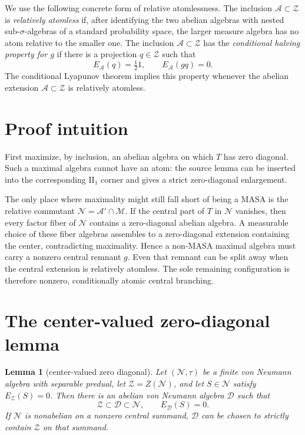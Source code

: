 \documentclass[11pt]{article}
\newtheorem{lemma}{Lemma}
\newcommand{\M}{\mathcal M}
\newcommand{\A}{\mathcal A}
\newcommand{\N}{\mathcal N}
\newcommand{\Z}{\mathcal Z}
\newcommand{\D}{\mathcal D}
\begin{document}
We use the following concrete form of relative atomlessness. The inclusion
$\A\subset\Z$ is \emph{relatively atomless} if, after identifying the two
abelian algebras with nested sub-$\sigma$-algebras of a standard probability
space, the larger measure algebra has no atom relative to the smaller one.
The inclusion
$\A\subset\Z$ has the \emph{conditional halving property for $g$} if there is
a projection $q\in\Z$ such that
\[
 E_{\A}(q)=\tfrac12 1,
 \qquad E_{\A}(gq)=0.
\]
The conditional Lyapunov theorem \cite{DE} implies this property whenever the
abelian extension $\A\subset\Z$ is relatively atomless.

\section{Proof intuition}

First maximize, by inclusion, an abelian algebra on which $T$ has zero
diagonal. Such a maximal algebra cannot have an atom: the source lemma can be
inserted into the corresponding $\mathrm{II}_1$ corner and gives a strict
zero-diagonal enlargement.

The only place where maximality might still fall short of being a MASA is the
relative commutant $\N=\A'\cap\M$. If the central part of $T$ in $\N$ vanishes,
then every factor fiber of $\N$ contains a zero-diagonal abelian algebra. A
measurable choice of these fiber algebras assembles to a zero-diagonal
extension containing the center, contradicting maximality. Hence a non-MASA
maximal algebra must carry a nonzero central remnant $g$. Even that remnant can
be split away when the central extension is relatively atomless. The sole
remaining configuration is therefore nonzero, conditionally atomic central
branching.

\section{The center-valued zero-diagonal lemma}

\begin{lemma}[center-valued zero diagonal]\label{lem:center}
Let $(\N,\tau)$ be a finite von Neumann algebra with separable predual, let
$\Z=Z(\N)$, and let $S\in\N$ satisfy $E_{\Z}(S)=0$. Then there is an abelian
von Neumann algebra $\D$ such that
\[
 \Z\subset\D\subset\N,
 \qquad E_{\D}(S)=0.
\]
If $\N$ is nonabelian on a nonzero central summand, $\D$ can be chosen to
strictly contain $\Z$ on that summand.
\end{lemma}
\end{document}
